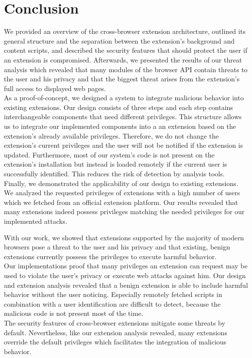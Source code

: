 
\chapter{Conclusion}
\label{chp:conclusion}

	We provided an overview of the cross-browser extension architecture, outlined its general structure and the separation between the extension's background and content scripts, and described the security features that should protect the user if an extension is compromised. Afterwards, we presented the results of our threat analysis which revealed that many modules of the browser API contain threats to the user and his privacy and that the biggest threat arises from the extension's full access to displayed web pages.\\
	As a proof-of-concept, we designed a system to integrate malicious behavior into existing extensions. Our design consists of three steps and each step contains interchangeable components that need different privileges. This structure allows us to integrate our implemented components into a an extension based on the extension's already available privileges. Therefore, we do not change the extension's current privileges and the user will not be notified if the extension is updated. Furthermore, most of our system's code is not present on the extension's installation but instead is loaded remotely if the current user is successfully identified. This reduces the risk of detection by analysis tools. \\	
	Finally, we demonstrated the applicability of our design to existing extensions. We analyzed the requested privileges of extensions with a high number of users which we fetched from an official extension platform. Our results revealed that many extensions indeed possess privileges matching the needed privileges for our implemented attacks.
	
	With our work, we showed that extensions supported by the majority of modern browsers pose a threat to the user and his privacy and that existing, benign extensions currently possess the privileges to execute harmful behavior. \\	
	Our implementations proof that many privileges an extension can request may be used to violate the user's privacy or execute web attacks against him. Our design and extension analysis revealed that a benign extension is able to include harmful behavior without the user noticing. Especially remotely fetched scripts in combination with a user identification are difficult to detect, because the malicious code is not present most of the time. \\
	The security features of cross-browser extensions mitigate some threats by default. Nevertheless, like our extension analysis revealed, many extensions override the default privileges which facilitates the integration of malicious behavior.